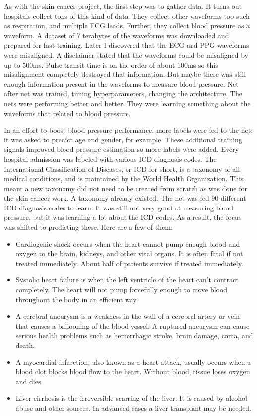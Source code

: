 As with the skin cancer project, the first step was to gather data.  It turns out hospitals collect tons of this kind of data.  They collect other waveforms too such as respiration, and multiple ECG leads.  Further, they collect blood pressure as a waveform.  A dataset of 7 terabytes of the waveforms was downloaded and prepared for fast training.  Later I discovered that the ECG and PPG waveforms were misaligned.  A disclaimer stated that the waveforms could be misaligned by up to 500ms. Pulse transit time is on the order of about 100ms so this misalignment completely destroyed that information.  But maybe there was still enough information present in the waveforms to measure blood pressure.  Net after net was trained, tuning hyperparameters, changing the architecture.  The nets were performing better and better.  They were learning something about the waveforms that related to blood pressure.

In an effort to boost blood pressure performance, more labels were fed to the net: it was asked to predict age and gender, for example.  These additional training signals improved blood pressure estimation so more labels were added.  Every hospital admission was labeled with various ICD diagnosis codes.  The International Classification of Diseases, or ICD for short, is a taxonomy of all medical conditions, and is maintained by the World Health Organization.  This meant a new taxonomy did not need to be created from scratch as was done for the skin cancer work.  A taxonomy already existed.  The net was fed 90 different ICD diagnosis codes to learn.  It was still not very good at measuring blood pressure, but it was learning a lot about the ICD codes.  As a result, the focus was shifted to predicting these.  Here are a few of them:

\begin{itemize}
    \item Cardiogenic shock occurs when the heart cannot pump enough blood and oxygen to the brain, kidneys, and other vital organs.  It is often fatal if not treated immediately.  About half of patients survive if treated immediately.
    \item Systolic heart failure is when the left ventricle of the heart can’t contract completely.  The heart will not pump forcefully enough to move blood throughout the body in an efficient way
    \item A cerebral aneurysm is a weakness in the wall of a cerebral artery or vein that causes a ballooning of the blood vessel.  A ruptured aneurysm can cause serious health problems such as hemorrhagic stroke, brain damage, coma, and death.
    \item A myocardial infarction, also known as a heart attack, usually occurs when a blood clot blocks blood flow to the heart.  Without blood, tissue loses oxygen and dies
    \item Liver cirrhosis is the irreversible scarring of the liver.  It is caused by alcohol abuse and other sources.  In advanced cases a liver transplant may be needed.
\end{itemize}

